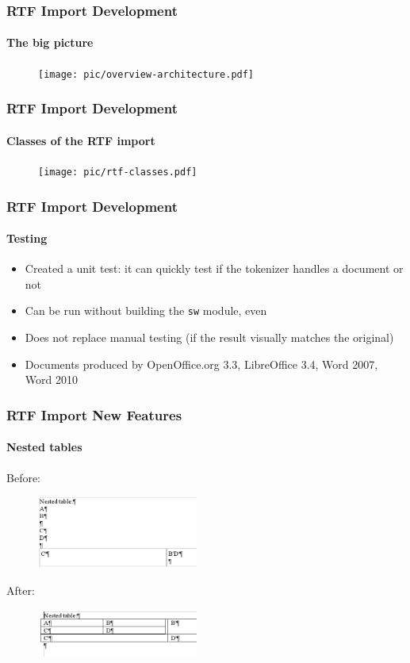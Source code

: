 \documentclass{beamer}
\begin{document}
\begin{frame}
\frametitle{RTF Import Development}
\framesubtitle{The big picture}
\begin{figure}[H]
\texttt{[image: pic/overview-architecture.pdf]}
\end{figure}
\end{frame}

\begin{frame}
\frametitle{RTF Import Development}
\framesubtitle{Classes of the RTF import}
\begin{figure}[H]
\texttt{[image: pic/rtf-classes.pdf]}
\end{figure}
\end{frame}

\begin{frame}
\frametitle{RTF Import Development}
\framesubtitle{Testing}
\begin{itemize}
\item Created a unit test: it can quickly test if the tokenizer handles a document or not
\item Can be run without building the \texttt{sw} module, even
\item Does not replace manual testing (if the result visually matches the original)
\item Documents produced by OpenOffice.org 3.3, LibreOffice 3.4, Word 2007, Word 2010
\end{itemize}
\end{frame}

\begin{frame}
\frametitle{RTF Import New Features}
\framesubtitle{Nested tables}
Before:
\begin{figure}[H]
\includegraphics[width=200px,keepaspectratio]{pic/nested-old.png}
\end{figure}
After:
\begin{figure}[H]
\includegraphics[width=200px,keepaspectratio]{pic/nested-new.png}
\end{figure}
\end{frame}
\end{document}

